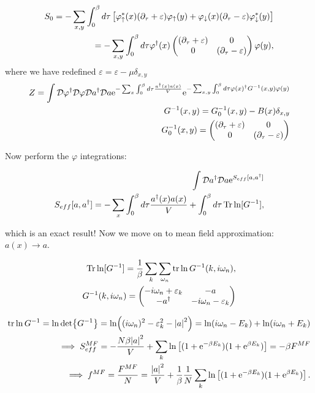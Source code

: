 \begin{align*}
    S_0 = -\sum_{x,y} \int_0^\beta d \tau \left[ \varphi_\uparrow^*(x)(\partial_\tau + \varepsilon)\varphi_\uparrow(y) + \varphi_\downarrow(x) (\partial_\tau - \varepsilon)\varphi_\downarrow^*(y) \right] \\ 
    = -\sum_{x,y} \int_0^\beta d \tau \varphi^\dagger (x)\begin{pmatrix}(\partial_\tau + \varepsilon)  & 0 \\ 0 & (\partial_\tau -\varepsilon) \end{pmatrix} \varphi(y),
\end{align*}
where we have redefined $\varepsilon = \varepsilon-\mu \delta_{x,y}$
\begin{align*}
    Z = \int \mathcal{D} \varphi^\dagger \mathcal{D} \varphi \mathcal{D} a^{\dagger} \mathcal{D} a \mathrm{e}^{-\sum_x \int_0^\beta d \tau \frac{a^{\dagger} (x) a(x)}{V}} \mathrm{e}^{-\sum_{x,y} \int_0^\beta d \tau \varphi(x)^\dagger G^{-1}(x,y)\varphi(y)} \\ 
    G^{-1}(x,y) = G_0 ^{-1} (x,y) - B(x) \delta_{x,y} \\
    G_0^{-1}(x,y) = \begin{pmatrix}(\partial_\tau + \varepsilon)  & 0 \\ 0 & (\partial_\tau -\varepsilon) \end{pmatrix}
\end{align*}

Now perform the $\varphi$ integrations: 

\begin{align*}
    \int \mathcal{D} a^{\dagger} \mathcal{D} a \mathrm{e}^{S_{eff}[a, a^{\dagger}]} \\ 
    S_{eff}[a, a^{\dagger}] = -\sum_x \int_0^\beta d \tau \frac{a^{\dagger}(x) a(x)}{V} + \int_0^\beta d \tau \Tr \ln [G^{-1} ],
\end{align*}

which is an exact result! Now we move on to mean field approximation: $a(x) \to a$. 

\begin{align*}
    \Tr \ln [G^{-1}] = \frac{1}{\beta} \sum_k \sum_{\omega_n} \tr \ln G^{-1} (k, i\omega_n), \\ 
    G^{-1}(k, i\omega_n) = \begin{pmatrix}-i\omega_n + \varepsilon_k  & -a \\ -a^{\dagger} & -i\omega_n -\varepsilon_k \end{pmatrix}
\end{align*}

\begin{align*}
    \tr \ln G^{-1} = \ln \det{G^{-1}} = \ln((i\omega_n)^2 - \varepsilon_k^{2} -\abs{a}^{2}) = \ln(i\omega_n - E_k) + \ln(i\omega_n + E_k) \\ 
    \implies S_{eff}^{MF} = -\frac{N\beta \abs{a}^2}{V} + \sum_k \ln \left[ (1+\mathrm{e}^{-\beta E_k})(1 + \mathrm{e}^{\beta E_k})\right] = -\beta F^{MF} \\ 
    \implies f^{MF} = \frac{F^{MF}}{N} = \frac{\abs{a}^2}{V} +\frac{1}{\beta} \frac{1}{N}\sum_k \ln \left[ (1+\mathrm{e}^{-\beta E_k})(1 + \mathrm{e}^{\beta E_k})\right].
\end{align*}

